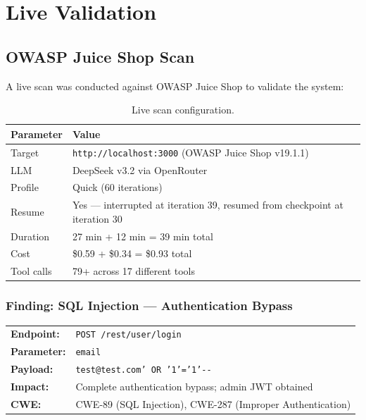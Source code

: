 \documentclass[12pt,a4paper]{report}
\begin{document}
\chapter{Live Validation}

\section{OWASP Juice Shop Scan}

A live scan was conducted against OWASP Juice Shop to validate the system:

\begin{table}[H]
\centering
\caption{Live scan configuration.}
\begin{tabularx}{\textwidth}{lX}
\toprule
\textbf{Parameter} & \textbf{Value} \\
\midrule
Target       & \texttt{http://localhost:3000} (OWASP Juice Shop v19.1.1) \\
LLM          & DeepSeek v3.2 via OpenRouter \\
Profile      & Quick (60 iterations) \\
Resume       & Yes --- interrupted at iteration 39, resumed from checkpoint at iteration 30 \\
Duration     & 27 min + 12 min = 39 min total \\
Cost         & \$0.59 + \$0.34 = \$0.93 total \\
Tool calls   & 79+ across 17 different tools \\
\bottomrule
\end{tabularx}
\end{table}

\subsection{Finding: SQL Injection --- Authentication Bypass}

\begin{infobox}
\begin{tabularx}{\textwidth}{lX}
\textbf{Endpoint:}  & \texttt{POST /rest/user/login} \\
\textbf{Parameter:} & \texttt{email} \\
\textbf{Payload:}   & \texttt{test@test.com' OR '1'='1'-{}-} \\
\textbf{Impact:}    & Complete authentication bypass; admin JWT obtained \\
\textbf{CWE:}       & CWE-89 (SQL Injection), CWE-287 (Improper Authentication) \\
\end{tabularx}
\end{infobox}
\end{document}
